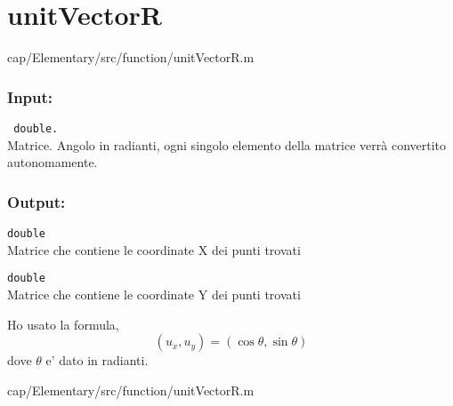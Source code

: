 \section{unitVectorR}\label{fnc:unitVectorR}


{cap/Elementary/src/function/unitVectorR.m}%

\subsubsection{Input:}
\begin{tcolorbox}
    \begin{description} 
\setlength{\itemindent}{-.2in}%

        \item[\textit{angleR:}] \verb| double.|\\
        Matrice. Angolo in radianti, ogni singolo elemento della matrice verrà 
        convertito autonomamente.
    \end{description}
\end{tcolorbox}

\subsubsection{Output:}
\begin{tcolorbox}
    \begin{description}
\setlength{\itemindent}{-.2in}

        \item[\textit{x:}] \verb|double| \\
            Matrice che contiene le coordinate X dei punti trovati
            
        \item[\textit{y:}] \verb|double| \\
            Matrice che contiene le coordinate Y dei punti trovati
    \end{description}
\end{tcolorbox}

{}

Ho usato la formula, $$(u_x , u_y)=(\cos\theta,\sin\theta)$$ 
dove $\theta$ e' dato in radianti.

{cap/Elementary/src/function/unitVectorR.m}%
\pagebreak 

